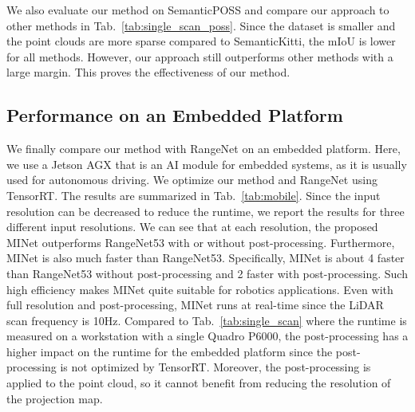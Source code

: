 \documentclass[letterpaper, 10 pt, journal, twoside]{ieeetran}
\newcommand{\tabref}[1]{Tab.~\ref{#1}}
\newcommand{\todo}[1]{#1}
\begin{document}
We also evaluate our method on SemanticPOSS \cite{pan2020semanticposs} and compare our approach to other methods in \tabref{tab:single_scan_poss}. Since the dataset is smaller and the point clouds are more sparse compared to SemanticKitti, the mIoU is lower for all methods. However, our approach still outperforms other methods with a large margin.
This proves the effectiveness of our method.








\subsection{Performance on an Embedded Platform}
We finally compare our method with RangeNet on an embedded platform. 
Here, we use a Jetson AGX that is an AI module for embedded systems, as it is usually used for autonomous driving.
\todo{We optimize our method and RangeNet using TensorRT.}
The results are summarized in \tabref{tab:mobile}.
Since the input resolution can be decreased to reduce the runtime, we report the results for three different input resolutions.
We can see that at each resolution, the proposed MINet outperforms RangeNet53 \cite{milioto2019rangenet++} with or without post-processing. Furthermore, MINet is also much faster than RangeNet53.
Specifically, MINet is about 4 faster than RangeNet53 without post-processing and 2 faster with post-processing.
Such high efficiency makes MINet quite suitable for robotics applications.
Even with full resolution and post-processing, MINet runs at real-time since the LiDAR scan frequency is 10Hz. 
Compared to \tabref{tab:single_scan} where the runtime is measured on a workstation with a single Quadro P6000, the post-processing has a higher impact on the runtime for the embedded platform since the post-processing is not optimized by TensorRT.
Moreover, the post-processing is applied to the point cloud, so it cannot benefit from reducing the resolution of the projection map.
\end{document}
